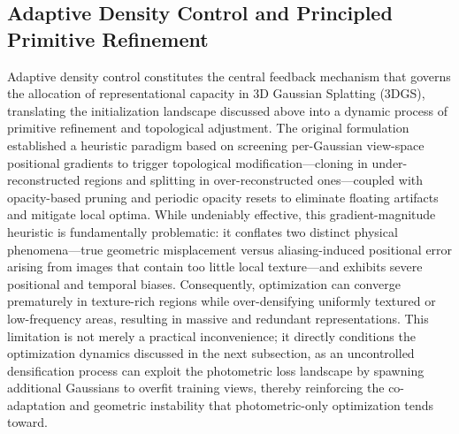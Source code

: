 \documentclass[11pt,a4paper]{article}
\begin{document}
\subsection{Adaptive Density Control and Principled Primitive Refinement}


Adaptive density control constitutes the central feedback mechanism that governs the allocation of representational capacity in 3D Gaussian Splatting (3DGS), translating the initialization landscape discussed above into a dynamic process of primitive refinement and topological adjustment. The original formulation \cite{arxiv:2308.04079v1} established a heuristic paradigm based on screening per-Gaussian view-space positional gradients to trigger topological modification---cloning in under-reconstructed regions and splitting in over-reconstructed ones---coupled with opacity-based pruning and periodic opacity resets to eliminate floating artifacts and mitigate local optima. While undeniably effective, this gradient-magnitude heuristic is fundamentally problematic: it conflates two distinct physical phenomena---true geometric misplacement versus aliasing-induced positional error arising from images that contain too little local texture---and exhibits severe positional and temporal biases. Consequently, optimization can converge prematurely in texture-rich regions while over-densifying uniformly textured or low-frequency areas, resulting in massive and redundant representations. This limitation is not merely a practical inconvenience; it directly conditions the optimization dynamics discussed in the next subsection, as an uncontrolled densification process can exploit the photometric loss landscape by spawning additional Gaussians to overfit training views, thereby reinforcing the co-adaptation and geometric instability that photometric-only optimization tends toward.
\end{document}

